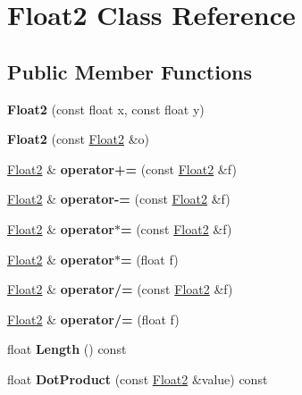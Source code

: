 \hypertarget{class_float2}{}\section{Float2 Class Reference}
\label{class_float2}
\subsection*{Public Member Functions}
\begin{DoxyCompactItemize}
\item 
\mbox{\label{class_float2_acddb9a1528c4bb0eea5d6f5ff394ba22}} 
{\bfseries Float2} (const float x, const float y)
\item 
\mbox{\label{class_float2_ab422f688e2ff254c22836497b4c16e38}} 
{\bfseries Float2} (const \mbox{\hyperlink{class_float2}{Float2}} \&o)
\item 
\mbox{\label{class_float2_ad68c300eb978ed1a8dec8248595153cd}} 
\mbox{\hyperlink{class_float2}{Float2}} \& {\bfseries operator+=} (const \mbox{\hyperlink{class_float2}{Float2}} \&f)
\item 
\mbox{\label{class_float2_accef0e6077301b5162f99a9fca6bf7b2}} 
\mbox{\hyperlink{class_float2}{Float2}} \& {\bfseries operator-\/=} (const \mbox{\hyperlink{class_float2}{Float2}} \&f)
\item 
\mbox{\label{class_float2_a4a5c4efbab76f1c7f8b1c876a30663e4}} 
\mbox{\hyperlink{class_float2}{Float2}} \& {\bfseries operator$\ast$=} (const \mbox{\hyperlink{class_float2}{Float2}} \&f)
\item 
\mbox{\label{class_float2_a9abbc77af852462394ef5a0514d2a782}} 
\mbox{\hyperlink{class_float2}{Float2}} \& {\bfseries operator$\ast$=} (float f)
\item 
\mbox{\label{class_float2_ae6400fc6994d7bc8925eaa5111d63504}} 
\mbox{\hyperlink{class_float2}{Float2}} \& {\bfseries operator/=} (const \mbox{\hyperlink{class_float2}{Float2}} \&f)
\item 
\mbox{\label{class_float2_a4994310a9af656c23d41d67da206d026}} 
\mbox{\hyperlink{class_float2}{Float2}} \& {\bfseries operator/=} (float f)
\item 
\mbox{\label{class_float2_ab59a4832e69acfeb62c5b7105a08bb4f}} 
float {\bfseries Length} () const
\item 
\mbox{\label{class_float2_a2e60f4ddef18566c8945d95812c875c6}} 
float {\bfseries Dot\+Product} (const \mbox{\hyperlink{class_float2}{Float2}} \&value) const
\end{DoxyCompactItemize}
